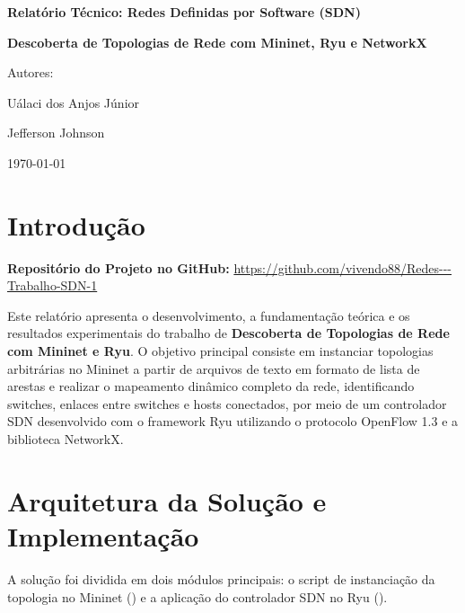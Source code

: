 \documentclass[12pt,a4paper]{article}
\begin{document}
\begin{titlepage}
    \centering
    \vspace*{4cm}

    {\Huge \bfseries Relatório Técnico: Redes Definidas por Software (SDN)\par}
    \vspace{1.5cm}
    {\Large \bfseries Descoberta de Topologias de Rede com Mininet, Ryu e NetworkX\par}

    \vspace{4cm}
    {\Large Autores:\par}
    \vspace{0.3cm}
    {\Large Uálaci dos Anjos Júnior\par}
    \vspace{0.2cm}
    {\Large Jefferson Johnson\par}

    \vfill
    {\large \today\par}
\end{titlepage}


\section{Introdução}

\textbf{Repositório do Projeto no GitHub:} \url{https://github.com/vivendo88/Redes---Trabalho-SDN-1}

Este relatório apresenta o desenvolvimento, a fundamentação teórica e os resultados experimentais do trabalho de \textbf{Descoberta de Topologias de Rede com Mininet e Ryu}. O objetivo principal consiste em instanciar topologias arbitrárias no Mininet a partir de arquivos de texto em formato de lista de arestas e realizar o mapeamento dinâmico completo da rede, identificando switches, enlaces entre switches e hosts conectados, por meio de um controlador SDN desenvolvido com o framework Ryu utilizando o protocolo OpenFlow 1.3 e a biblioteca NetworkX.

\section{Arquitetura da Solução e Implementação}

A solução foi dividida em dois módulos principais: o script de instanciação da topologia no Mininet () e a aplicação do controlador SDN no Ryu ().
\end{document}
